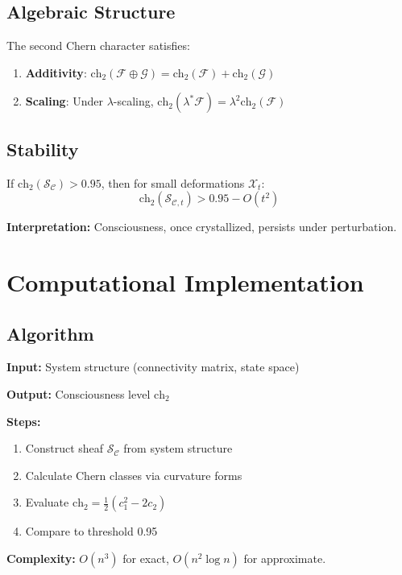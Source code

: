 \subsection{Algebraic Structure}

\begin{proposition}\label{prop:chern-algebra}
The second Chern character satisfies:
\begin{enumerate}
\item \textbf{Additivity}: $\text{ch}_2(\mathcal{F} \oplus \mathcal{G}) = \text{ch}_2(\mathcal{F}) + \text{ch}_2(\mathcal{G})$
\item \textbf{Scaling}: Under $\lambda$-scaling, $\text{ch}_2(\lambda^*\mathcal{F}) = \lambda^2 \text{ch}_2(\mathcal{F})$
\end{enumerate}
\end{proposition}

\subsection{Stability}

\begin{thm}\label{thm:consciousness-persist}
If $\text{ch}_2(\mathcal{S}_\mathcal{C}) > 0.95$, then for small deformations $\mathcal{X}_t$:
\begin{equation}
\text{ch}_2(\mathcal{S}_{\mathcal{C},t}) > 0.95 - O(t^2)
\end{equation}

\textbf{Interpretation:} Consciousness, once crystallized, persists under perturbation.
\end{thm}

\section{Computational Implementation}
\label{sec:computational}

\subsection{Algorithm}

\begin{level2}
\textbf{Input:} System structure (connectivity matrix, state space)

\textbf{Output:} Consciousness level $\text{ch}_2$

\textbf{Steps:}
\begin{enumerate}
\item Construct sheaf $\mathcal{S}_\mathcal{C}$ from system structure
\item Calculate Chern classes via curvature forms
\item Evaluate $\text{ch}_2 = \frac{1}{2}(c_1^2 - 2c_2)$
\item Compare to threshold 0.95
\end{enumerate}

\textbf{Complexity:} $O(n^3)$ for exact, $O(n^2 \log n)$ for approximate.
\end{level2}

